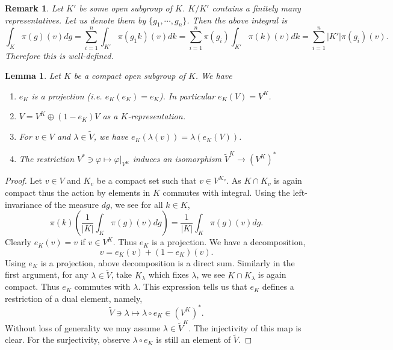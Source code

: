 \documentclass[8pt]{article}
\newtheorem{lemma}{Lemma}[section]
\newtheorem{remark}{Remark}[section]
\DeclareMathOperator{\Hom}{Hom}
\newcommand{\defeq}{\vcentcolon=}
\newcommand{\C}[0]{\mathbb{C}}
\begin{document}
\begin{remark}
Let $K'$ be some open subgroup of $K$. $K/K'$ contains a finitely many representatives. Let us denote them by $\{g_1,\cdots,g_n\}$. Then the above integral is
\begin{equation*}
\int_K\pi(g)(v)dg = \sum_{i=1}^n \int_{K'}\pi(g_1k)(v)dk = \sum_{i=1}^n \pi(g_i)\int_{K'}\pi(k)(v)dk = \sum_{i=1}^n\vert K'\vert\pi(g_i)(v).
\end{equation*}
Therefore this is well-defined.
\label{projector_finiteness}
\end{remark}

\begin{lemma}
Let $K$ be a compact open subgroup of $K$. We have
\begin{enumerate}[1).]
\item $e_K$ is a projection (i.e. $e_K(e_K) = e_K$). In particular $e_K(V) = V^K$. 
\item $V=V^K\oplus(1-e_K)V$ as a $K$-representation.
\item For $v\in V$ and $\lambda\in \widetilde{V}$, we have $e_K(\lambda(v)) = \lambda(e_K(V))$.
\item The restriction $V^*\ni \varphi\mapsto \varphi|_{V^K}$ induces an isomorphism $\widetilde{V}^K\to(V^K)^*$%
\end{enumerate}
\label{projector_operator_properties}\label{lemma_5}
\end{lemma}

\begin{proof}
Let $v\in V$ and $K_v$ be a compact set such that $v\in V^{K_v}$. As $K\cap K_v$ is again compact thus the action by elements in $K$ commutes with integral. Using the left-invariance of the measure $dg$, we see for all $k\in K$,
\begin{equation*}
  \pi(k)\left({\frac 1 {\vert K\vert}}\int_K\pi(g)(v)dg\right) = {\frac 1 {\vert K\vert}}\int_K\pi(g)(v)dg.
\end{equation*}
Clearly $e_K(v) = v$ if $v\in V^K$. Thus $e_K$ is a projection. We have a decomposition,
\begin{equation*}
  v = e_K(v) + (1-e_K)(v).
\end{equation*}
Using $e_K$ is a projection, above decomposition is a direct sum. Similarly in the first argument, for any $\lambda\in \widetilde{V}$, take $K_\lambda$ which fixes $\lambda$, we see $K\cap K_\lambda$ is again compact. Thus $e_K$ commutes with $\lambda$.
This expression tells us that $e_K$ defines a restriction of a dual element, namely,
\begin{equation*}
  \widetilde{V}\ni\lambda\mapsto \lambda\circ e_K\in (V^K)^*.
\end{equation*}
Without loss of generality we may assume $\lambda\in \widetilde{V}^K$. The injectivity of this map is clear. For the surjectivity, observe $\lambda\circ e_K$ is still an element of $\widetilde{V}$.
\end{proof}
\end{document}
